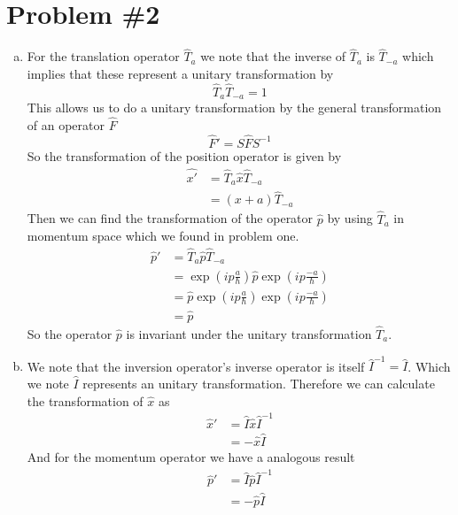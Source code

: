 \documentclass[11pt]{article}
\numberwithin{equation}{section}
\begin{document}
\section{Problem \#2}
\begin{enumerate}[(a)]
\item For the translation operator $\hat{T}_{a}$ we note that the inverse of $\hat{T}_a$ is
$\hat{T}_{-a}$ which implies that these represent a unitary transformation by
$$\hat{T}_{a}\hat{T}_{-a} = 1$$
This allows us to do a unitary transformation by the general transformation of an operator 
$\hat{F}$
$$\hat{F}' = S\hat{F}S^{-1}$$
So the transformation of the position operator is given by
\begin{align*}
\hat{x'} &= \hat{T}_{a}\hat{x}\hat{T}_{-a}\\
&= (x+a)\hat{T}_{-a}
\end{align*}
Then we can find the transformation of the operator $\hat{p}$ by using $\hat{T}_{a}$ in 
momentum space which we found in problem one.
\begin{align*}
\hat{p}' &= \hat{T}_{a}\hat{p}\hat{T}_{-a}\\
&= \exp\left(ip\frac{a}{\hbar}\right)\hat{p}\exp\left(ip\frac{-a}{\hbar}\right)\\
&= \hat{p}\exp\left(ip\frac{a}{\hbar}\right)\exp\left(ip\frac{-a}{\hbar}\right)\\
&= \hat{p}
\end{align*}
So the operator $\hat{p}$ is invariant under the unitary transformation $\hat{T}_{a}$.

\item We note that the inversion operator's inverse operator is itself $\hat{I}^{-1}=\hat{I}$.
Which we note $\hat{I}$ represents an unitary transformation. Therefore we can calculate the
transformation of $\hat{x}$ as
\begin{align*}
\hat{x}' &= \hat{I}\hat{x}\hat{I}^{-1}\\
&= -\hat{x}\hat{I}
\end{align*}
And for the momentum operator we have a analogous result
\begin{align*}
\hat{p}' &= \hat{I}\hat{p}\hat{I}^{-1}\\
&= -\hat{p}\hat{I}
\end{align*}



\end{enumerate}

\pagebreak
\end{document}
